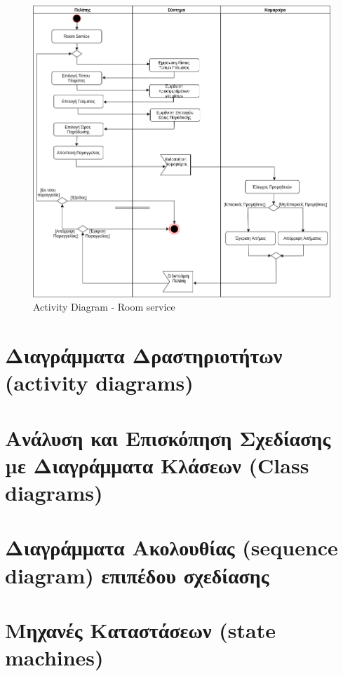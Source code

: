 \begin{figure}[H]
	\centering
	\includegraphics[width=1\textwidth]{Images/Activity-Room service}
		\caption{Activity Diagram - Room service}
		\label{Activity - Room service}
\end{figure}
\clearpage
\section{Διαγράμματα Δραστηριοτήτων (activity diagrams)}
\section{Ανάλυση και Επισκόπηση Σχεδίασης µε Διαγράμματα Κλάσεων (Class diagrams)}
\section{Διαγράμματα Ακολουθίας (sequence diagram) επιπέδου σχεδίασης}
\section{Μηχανές Καταστάσεων (state machines)}

